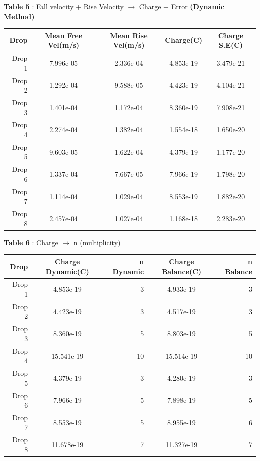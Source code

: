 \documentclass{article}
\begin{document}
\vspace{20pt}

\textbf{Table 5} : Fall velocity + Rise Velocity $\rightarrow$ Charge + Error \textbf{(Dynamic Method)}

\begin{tabular}{|r|S|S|S|S|}
  \hline
  \textbf{Drop} & \textbf{Mean Free Vel(m/s)} & \textbf{Mean Rise Vel(m/s)} & \textbf{Charge(C)} & \textbf{Charge S.E(C)} \\
  \hline
  Drop 1 & 7.996e-05 & 2.336e-04 & 4.853e-19 & 3.479e-21 \\
  Drop 2 & 1.292e-04 & 9.588e-05 & 4.423e-19 & 4.104e-21 \\
  Drop 3 & 1.401e-04 & 1.172e-04 & 8.360e-19 & 7.908e-21 \\
  Drop 4 & 2.274e-04 & 1.382e-04 & 1.554e-18 & 1.650e-20 \\
  Drop 5 & 9.603e-05 & 1.622e-04 & 4.379e-19 & 1.177e-20 \\
  Drop 6 & 1.337e-04 & 7.667e-05 & 7.966e-19 & 1.798e-20 \\
  Drop 7 & 1.114e-04 & 1.029e-04 & 8.553e-19 & 1.882e-20 \\
  Drop 8 & 2.457e-04 & 1.027e-04 & 1.168e-18 & 2.283e-20 \\
  \hline
\end{tabular}

\vspace{50pt}

\textbf{Table 6} : Charge $\rightarrow$ n (multiplicity)

\begin{tabular}{|r|S|r|S|r|}
  \hline
  \textbf{Drop} & \textbf{Charge Dynamic(C)} & \textbf{n Dynamic} & \textbf{Charge Balance(C)} & \textbf{n Balance} \\
  \hline
  Drop 1 & 4.853e-19 & 3 & 4.933e-19 & 3 \\
  Drop 2 & 4.423e-19 & 3 & 4.517e-19 & 3 \\
  Drop 3 & 8.360e-19 & 5 & 8.803e-19 & 5 \\
  Drop 4 & 15.541e-19 & 10 & 15.514e-19 & 10 \\
  Drop 5 & 4.379e-19 & 3 & 4.280e-19 & 3 \\
  Drop 6 & 7.966e-19 & 5 & 7.898e-19 & 5 \\
  Drop 7 & 8.553e-19 & 5 & 8.955e-19 & 6 \\
  Drop 8 & 11.678e-19 & 7 & 11.327e-19 & 7 \\
  \hline
\end{tabular}
\end{document}
